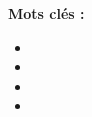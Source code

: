 \begin{titlepage}
\begin{textblock*}{15cm}
\begin{multicols}{2}
\begin{large}
                \columnbreak

				\begin{center}
                	{\color{white}\textbf{Mots clés :}}
				\end{center}
                {\color{white}\begin{itemize}
                    \item \makeatletter \@keywordone \makeatother
                    \item \makeatletter \@keywordtwo \makeatother
                    \item \makeatletter \@keywordthree \makeatother
                    \item \makeatletter \@keywordfour \makeatother
                \end{itemize}}
            \end{large}
        \end{multicols}
    \end{textblock*}
\end{titlepage}

